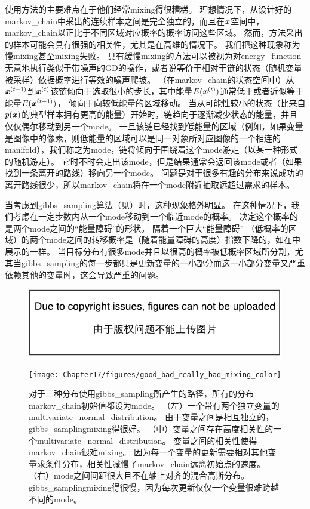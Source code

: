使用方法的主要难点在于他们经常\gls{mixing}得很糟糕。
理想情况下，从设计好的\gls{markov_chain}中采出的连续样本之间是完全独立的，而且在$\boldsymbol{\mathit{x}}$空间中，\gls{markov_chain}以正比于不同区域对应概率的概率访问这些区域。
然而，方法采出的样本可能会具有很强的相关性，尤其是在高维的情况下。
我们把这种现象称为慢\gls{mixing}甚至\gls{mixing}失败。
具有缓慢\gls{mixing}的方法可以被视为对\gls{energy_function}无意地执行类似于带噪声的\gls{GD}的操作，或者说等价于相对于链的状态（随机变量被采样）依据概率进行等效的噪声爬坡。
（在\gls{markov_chain}的状态空间中）从$\boldsymbol{\mathit{x}}^{(t-1)}$到$\boldsymbol{\mathit{x}}^{(t)}$该链倾向于选取很小的步长，其中能量$E(\boldsymbol{\mathit{x}}^{(t)})$通常低于或者近似等于能量$E(\boldsymbol{\mathit{x}}^{(t-1)})$，
倾向于向较低能量的区域移动。
当从可能性较小的状态（比来自$p(\boldsymbol{\mathit{x}})$的典型样本拥有更高的能量）开始时，链趋向于逐渐减少状态的能量，并且仅仅偶尔移动到另一个\gls{mode}。
一旦该链已经找到低能量的区域（例如，如果变量是图像中的像素，则低能量的区域可以是同一对象所对应图像的一个相连的\gls{manifold}），我们称之为\gls{mode}，链将倾向于围绕着这个\gls{mode}游走（以某一种形式的随机游走）。
它时不时会走出该\gls{mode}，但是结果通常会返回该\gls{mode}或者（如果找到一条离开的路线）移向另一个\gls{mode}。
问题是对于很多有趣的分布来说成功的离开路线很少，所以\gls{markov_chain}将在一个\gls{mode}附近抽取远超过需求的样本。


当考虑到\gls{gibbs_sampling}算法（见）时，这种现象格外明显。
在这种情况下，我们考虑在一定步数内从一个\gls{mode}移动到一个临近\gls{mode}的概率。
决定这个概率的是两个\gls{mode}之间的``能量障碍''的形状。
隔着一个巨大``能量障碍'' （低概率的区域）的两个\gls{mode}之间的转移概率是（随着能量障碍的高度）指数下降的，如在中展示的一样。
当目标分布有很多\gls{mode}并且以很高的概率被低概率区域所分割，尤其当\gls{gibbs_sampling}的每一步都只是更新变量的一小部分而这一小部分变量又严重依赖其他的变量时，这会导致严重的问题。


\begin{figure}[!htb]
\ifOpenSource
\centerline{\includegraphics{figure.pdf}}
\else
	\centerline{\texttt{[image: Chapter17/figures/good\_bad\_really\_bad\_mixing\_color]}}
\fi
\caption{对于三种分布使用\gls{gibbs_sampling}所产生的路径，所有的分布\gls{markov_chain}初始值都设为\gls{mode}。
（左）一个带有两个独立变量的\gls{multivariate_normal_distribution}。
由于变量之间是相互独立的，\gls{gibbs_sampling}\gls{mixing}得很好。
（中）变量之间存在高度相关性的一个\gls{multivariate_normal_distribution}。
变量之间的相关性使得\gls{markov_chain}很难\gls{mixing}。
因为每一个变量的更新需要相对其他变量求条件分布，相关性减慢了\gls{markov_chain}远离初始点的速度。
（右）\gls{mode}之间间距很大且不在轴上对齐的混合高斯分布。
\gls{gibbs_sampling}\gls{mixing}得很慢，因为每次更新仅仅一个变量很难跨越不同的\gls{mode}。}
\label{fig:chap17_good_bad_really_bad_mixing_color}
\end{figure}


